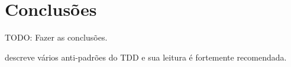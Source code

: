 \chapter{Conclusões} %
\label{cha:conclusoes}

TODO: Fazer as conclusões.

 descreve vários anti-padrões do TDD e sua leitura é fortemente recomendada.

